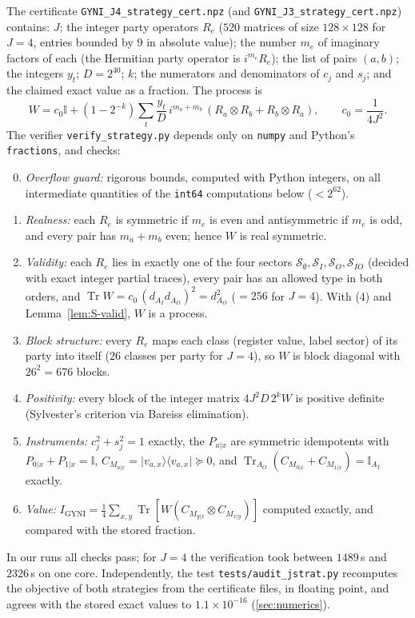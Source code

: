 \documentclass[aps,pra,onecolumn,notitlepage,superscriptaddress,longbibliography,nofootinbib,11pt]{revtex4-2}
\theoremstyle{remark}
\newcommand{\Tr}{\operatorname{Tr}}
\newcommand{\ket}[1]{\lvert #1\rangle}
\newcommand{\bra}[1]{\langle #1\rvert}
\newcommand{\one}{\mathbb{I}}
\newcommand{\Igy}{I_{\mathrm{GYNI}}}
\newcommand{\file}[1]{\texttt{#1}}
\begin{document}
The certificate \file{GYNI\_J4\_strategy\_cert.npz} (and \file{GYNI\_J3\_strategy\_cert.npz}) contains: $J$; the integer party operators $R_e$ ($520$ matrices of size $128\times128$ for $J=4$, entries bounded by $9$ in absolute value); the number $m_e$ of imaginary factors of each (the Hermitian party operator is $i^{m_e}R_e$); the list of pairs $(a,b)$; the integers $y_t$; $D=2^{40}$; $k$; the numerators and denominators of $c_j$ and $s_j$; and the claimed exact value as a fraction. The process is
\begin{equation}
W=c_0\one+(1-2^{-k})\sum_t\frac{y_t}{D}\,i^{m_a+m_b}\,(R_a\otimes R_b+R_b\otimes R_a),\qquad c_0=\frac{1}{4J^2}.
\end{equation}
The verifier \file{verify\_strategy.py} depends only on \file{numpy} and Python's \file{fractions}, and checks:
\begin{enumerate}
\setcounter{enumi}{-1}
\item \emph{Overflow guard:} rigorous bounds, computed with Python integers, on all intermediate quantities of the \file{int64} computations below ($<2^{62}$).
\item \emph{Realness:} each $R_e$ is symmetric if $m_e$ is even and antisymmetric if $m_e$ is odd, and every pair has $m_a+m_b$ even; hence $W$ is real symmetric.
\item \emph{Validity:} each $R_e$ lies in exactly one of the four sectors $\mathcal S_\emptyset,\mathcal S_I,\mathcal S_O,\mathcal S_{IO}$ (decided with exact integer partial traces), every pair has an allowed type in both orders, and $\Tr W=c_0\,(d_{A_I}d_{A_O})^2=d_{A_O}^2$ ($=256$ for $J=4$). With (4) and Lemma~\ref{lem:S-valid}, $W$ is a process.
\item \emph{Block structure:} every $R_e$ maps each class (register value, label sector) of its party into itself ($26$ classes per party for $J=4$), so $W$ is block diagonal with $26^2=676$ blocks.
\item \emph{Positivity:} every block of the integer matrix $4J^2D\,2^kW$ is positive definite (Sylvester's criterion via Bareiss elimination).
\item \emph{Instruments:} $c_j^2+s_j^2=1$ exactly, the $P_{a|x}$ are symmetric idempotents with $P_{0|x}+P_{1|x}=\one$, $C_{M_{a|x}}=\ket{v_{a,x}}\bra{v_{a,x}}\succeq0$, and $\Tr_{A_O}(C_{M_{0|x}}+C_{M_{1|x}})=\one_{A_I}$ exactly.
\item \emph{Value:} $\Igy=\frac14\sum_{x,y}\Tr[W(C_{M_{y|x}}\otimes C_{M_{x|y}})]$ computed exactly, and compared with the stored fraction.
\end{enumerate}
In our runs all checks pass; for $J=4$ the verification took between $1489$\,s and $2326$\,s on one core. Independently, the test \file{tests/audit\_jstrat.py} recomputes the objective of both strategies from the certificate files, in floating point, and agrees with the stored exact values to $1.1\times10^{-16}$ (\ref{sec:numerics}).
\end{document}
